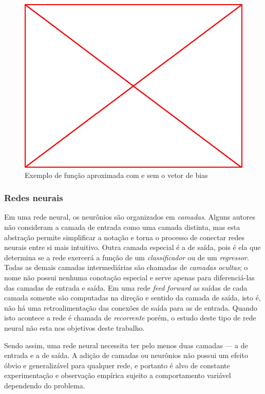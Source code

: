\begin{figure}
  \caption{Exemplo de função aproximada com e sem o vetor de bias}
  \begin{center}
    \includegraphics[scale=0.5]{placeholder}
  \end{center}
\end{figure}

\subsubsection{Redes neurais}

Em uma rede neural, os neurônios são organizados em \emph{camadas}. Alguns
autores não consideram a camada de entrada como uma camada distinta, mas esta
abstração permite simplificar a notação e torna o processo de conectar redes
neurais entre si mais intuitivo. Outra camada especial é a de saída, pois é
ela que determina se a rede exercerá a função de um \emph{classificador} ou de
um \emph{regressor}. Todas as demais camadas intermediárias são chamadas de
\emph{camadas ocultas}; o nome não possui nenhuma conotação especial e serve
apenas para diferenciá-las das camadas de entrada e saída. Em uma rede
\emph{feed forward} as saídas de cada camada somente são computadas na direção
e sentido da camada de saída, isto é, não há uma retroalimentação das conexões
de saída para as de entrada. Quando isto acontece a rede é chamada de
\emph{recorrente} porém, o estudo deste tipo de rede neural não esta nos
objetivos deste trabalho.

Sendo assim, uma rede neural necessita ter pelo menos duas camadas --- a de
entrada e a de saída. A adição de camadas ou neurônios não possui um efeito
óbvio e generalizável para qualquer rede, e portanto é alvo de constante
experimentação e observação empírica sujeito a comportamento variável
dependendo do problema.

